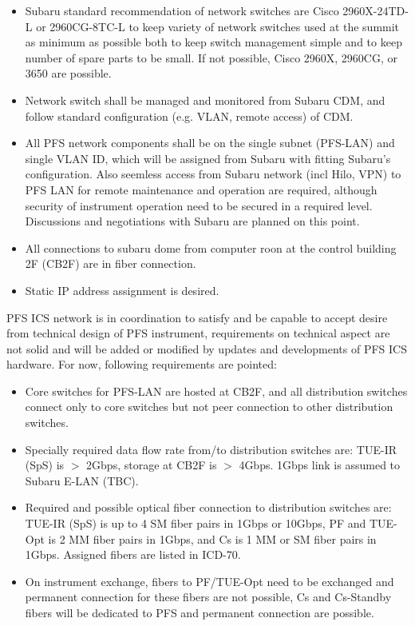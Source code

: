 \documentclass[a4paper,notitlepage]{article}
\begin{document}
\begin{itemize}
  \item Subaru standard recommendation of network switches are Cisco 
    2960X-24TD-L or 2960CG-8TC-L to keep variety of network switches used 
    at the summit as minimum as possible both to keep switch management simple 
    and to keep number of spare parts to be small. If not possible, Cisco 
    2960X, 2960CG, or 3650 are possible.
  \item Network switch shall be managed and monitored from Subaru CDM, and 
    follow standard configuration (e.g. VLAN, remote access) of CDM.
  \item All PFS network components shall be on the single subnet (PFS-LAN) and 
    single VLAN ID, which will be assigned from Subaru with fitting Subaru's 
    configuration. Also seemless access from Subaru network (incl Hilo, VPN) 
    to PFS LAN for remote maintenance and operation are required, although 
    security of instrument operation need to be secured in a required level.
    Discussions and negotiations with Subaru are planned on this point. 
  \item All connections to subaru dome from computer roon at the control 
    building 2F (CB2F) are in fiber connection. 
  \item Static IP address assignment is desired.
\end{itemize}

PFS ICS network is in coordination to satisfy and be capable to accept desire 
from technical design of PFS instrument, requirements on technical aspect are 
not solid and will be added or modified by updates and developments of PFS ICS 
hardware. For now, following requirements are pointed: 

\begin{itemize}
  \item Core switches for PFS-LAN are hosted at CB2F, and all distribution 
    switches connect only to core switches but not peer connection to other 
    distribution switches.
  \item Specially required data flow rate from/to distribution switches are: 
    TUE-IR (SpS) is $>$ 2Gbps, storage at CB2F is $>$ 4Gbps.
    1Gbps link is assumed to Subaru E-LAN (TBC).
  \item Required and possible optical fiber connection to distribution switches 
    are: TUE-IR (SpS) is up to 4 SM fiber pairs in 1Gbps or 10Gbps, PF and 
    TUE-Opt is 2 MM fiber pairs in 1Gbps, and Cs is 1 MM or SM fiber pairs in 
    1Gbps. Assigned fibers are listed in ICD-70.
  \item On instrument exchange, fibers to PF/TUE-Opt need to be exchanged and 
    permanent connection for these fibers are not possible, Cs and Cs-Standby 
    fibers will be dedicated to PFS and permanent connection are possible.
\end{itemize}
\end{document}
